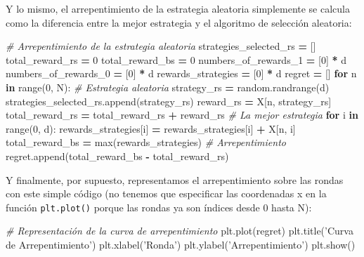 \documentclass[]{book}
\newenvironment{Shaded}{\begin{snugshade}}{\end{snugshade}}
\newcommand{\BuiltInTok}[1]{#1}
\newcommand{\CommentTok}[1]{\textcolor[rgb]{0.56,0.35,0.01}{\textit{#1}}}
\newcommand{\ControlFlowTok}[1]{\textcolor[rgb]{0.13,0.29,0.53}{\textbf{#1}}}
\newcommand{\DecValTok}[1]{\textcolor[rgb]{0.00,0.00,0.81}{#1}}
\newcommand{\KeywordTok}[1]{\textcolor[rgb]{0.13,0.29,0.53}{\textbf{#1}}}
\newcommand{\NormalTok}[1]{#1}
\newcommand{\OperatorTok}[1]{\textcolor[rgb]{0.81,0.36,0.00}{\textbf{#1}}}
\newcommand{\StringTok}[1]{\textcolor[rgb]{0.31,0.60,0.02}{#1}}
\begin{document}
Y lo mismo, el arrepentimiento de la estrategia aleatoria simplemente se calcula como la diferencia entre la mejor estrategia y el algoritmo de selección aleatoria:

\begin{Shaded}
\begin{Highlighting}[]
\CommentTok{# Arrepentimiento de la estrategia aleatoria}
\NormalTok{strategies_selected_rs }\OperatorTok{=}\NormalTok{ []}
\NormalTok{total_reward_rs }\OperatorTok{=} \DecValTok{0}
\NormalTok{total_reward_bs }\OperatorTok{=} \DecValTok{0}
\NormalTok{numbers_of_rewards_1 }\OperatorTok{=}\NormalTok{ [}\DecValTok{0}\NormalTok{] }\OperatorTok{*}\NormalTok{ d}
\NormalTok{numbers_of_rewards_0 }\OperatorTok{=}\NormalTok{ [}\DecValTok{0}\NormalTok{] }\OperatorTok{*}\NormalTok{ d}
\NormalTok{rewards_strategies }\OperatorTok{=}\NormalTok{ [}\DecValTok{0}\NormalTok{] }\OperatorTok{*}\NormalTok{ d}
\NormalTok{regret }\OperatorTok{=}\NormalTok{ []}
\ControlFlowTok{for}\NormalTok{ n }\KeywordTok{in} \BuiltInTok{range}\NormalTok{(}\DecValTok{0}\NormalTok{, N):}
    \CommentTok{# Estrategia aleatoria}
\NormalTok{    strategy_rs }\OperatorTok{=}\NormalTok{ random.randrange(d)}
\NormalTok{    strategies_selected_rs.append(strategy_rs)}
\NormalTok{    reward_rs }\OperatorTok{=}\NormalTok{ X[n, strategy_rs]}
\NormalTok{    total_reward_rs }\OperatorTok{=}\NormalTok{ total_reward_rs }\OperatorTok{+}\NormalTok{ reward_rs}
    \CommentTok{# La mejor estrategia}
    \ControlFlowTok{for}\NormalTok{ i }\KeywordTok{in} \BuiltInTok{range}\NormalTok{(}\DecValTok{0}\NormalTok{, d):}
\NormalTok{        rewards_strategies[i] }\OperatorTok{=}\NormalTok{ rewards_strategies[i] }\OperatorTok{+}\NormalTok{ X[n, i]}
\NormalTok{    total_reward_bs }\OperatorTok{=} \BuiltInTok{max}\NormalTok{(rewards_strategies)}
    \CommentTok{# Arrepentimiento}
\NormalTok{    regret.append(total_reward_bs }\OperatorTok{-}\NormalTok{ total_reward_rs)}
\end{Highlighting}
\end{Shaded}

Y finalmente, por supuesto, representamos el arrepentimiento sobre las rondas con este simple código (no tenemos que especificar las coordenadas x en la función \texttt{plt.plot()} porque las rondas ya son índices desde 0 hasta N):

\begin{Shaded}
\begin{Highlighting}[]
\CommentTok{# Representación de la curva de arrepentimiento}
\NormalTok{plt.plot(regret)}
\NormalTok{plt.title(}\StringTok{'Curva de Arrepentimiento'}\NormalTok{)}
\NormalTok{plt.xlabel(}\StringTok{'Ronda'}\NormalTok{)}
\NormalTok{plt.ylabel(}\StringTok{'Arrepentimiento'}\NormalTok{)}
\NormalTok{plt.show()}
\end{Highlighting}
\end{Shaded}
\end{document}
